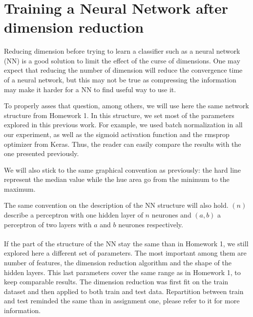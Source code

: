 \documentclass[twocolumn,a4paper,10pt]{article}
\begin{document}
\section{Training a Neural Network after dimension reduction}
\paragraph{}
Reducing dimension before trying to learn a classifier such as a neural network (NN) is a good solution to limit the effect of the curse of dimensions. One may expect that reducing the number of dimension will reduce the convergence time of a neural network, but this may not be true as compressing the information may make it harder for a NN to find useful way to use it.

To properly asses that question, among others, we will use here the same network structure from Homework 1. In this structure, we set most of the parameters explored in this previous work. For example, we used batch normalization in all our experiment, as well as the sigmoid activation function and the rmsprop optimizer from Keras. Thus, the reader can easily compare the results with the one presented previously.

We will also stick to the same graphical convention as previously: the hard line represent the median value while the hue area go from the minimum to the maximum.

The same convention on the description of the NN structure will also hold. $(n)$ describe a perceptron with one hidden layer of $n$ neurones and $(a,b)$ a perceptron of two layers with $a$ and $b$ neurones respectively.

\paragraph{}
If the part of the structure of the NN stay the same than in Homework 1, we still explored here a different set of parameters. The most important among them are number of features, the dimension reduction algorithm and the shape of the hidden layers. This last parameters cover the same range as in Homework 1, to keep comparable results. The dimension reduction was first fit on the train dataset and then applied to both train and test data. Repartition between train and test reminded the same than in assignment one, please refer to it for more information.
\end{document}
